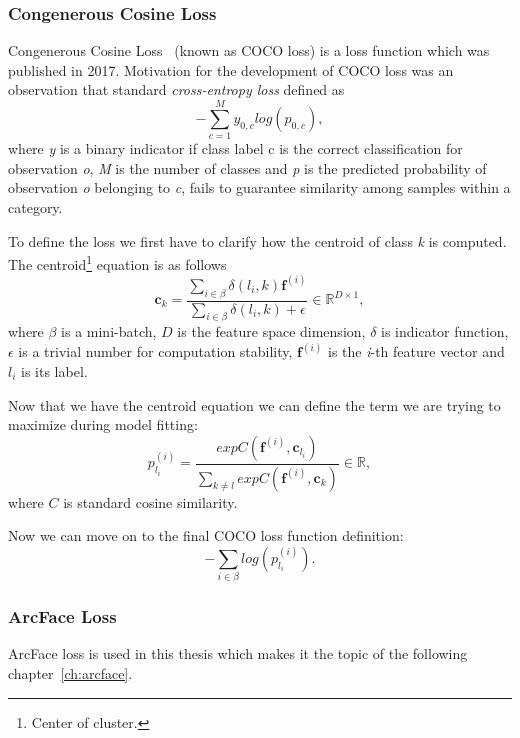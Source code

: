 \subsubsection{Congenerous Cosine Loss}
Congenerous Cosine Loss~\cite{CocoLoss} (known as COCO loss) is a loss function which was published in 2017.
Motivation for the development of COCO loss was an observation that standard \textit{cross-entropy loss} defined as
\begin{equation}
    - \sum_{c=1}^{M} y_{0,c} log(p_{0,c}),
\end{equation}
where \textit{y} is a binary indicator if class label c is the correct classification for observation \textit{o},
\textit{M} is the number of classes and \textit{p} is the predicted probability of observation \textit{o} belonging
to \textit{c}, fails to guarantee similarity among samples within a category.

To define the loss we first have to clarify how the centroid of class \textit{k} is computed.
The centroid\footnote{Center of cluster.} equation is as follows
\begin{equation}
    \boldsymbol{c}_{k} = \frac{\sum_{i \in \beta} \delta \left( l_i, k \right)\boldsymbol{f}^{(i)}}
    {\sum_{i \in \beta} \delta \left( l_i, k \right) + \epsilon} \in \mathbb{R}^{D \times 1},
\end{equation}
where $\beta$ is a mini-batch, $D$ is the feature space dimension, $\delta$ is indicator function, $\epsilon$ is a
trivial number for computation stability, $\boldsymbol{f}^{(i)}$ is the \textit{i}-th feature vector and $l_i$ is
its label.

Now that we have the centroid equation we can define the term we are trying to maximize during model fitting:
\begin{equation}
    p_{l_i}^{(i)} = \frac{exp C(\boldsymbol{f}^{(i)}, \boldsymbol{c}_{l_{i}})}
    {\sum_{k \neq l} exp C(\boldsymbol{f}^{(i)}, \boldsymbol{c}_{k})} \in \mathbb{R},
\end{equation}
where $C$ is standard cosine similarity.

Now we can move on to the final COCO loss function definition:
\begin{equation}
    - \sum_{i \in \beta} log \left( p_{l_i}^{(i)} \right).
\end{equation}


\subsubsection{ArcFace Loss}\label{subsubsec:arcface}
ArcFace loss is used in this thesis which makes it the topic of the following chapter~\ref{ch:arcface}.